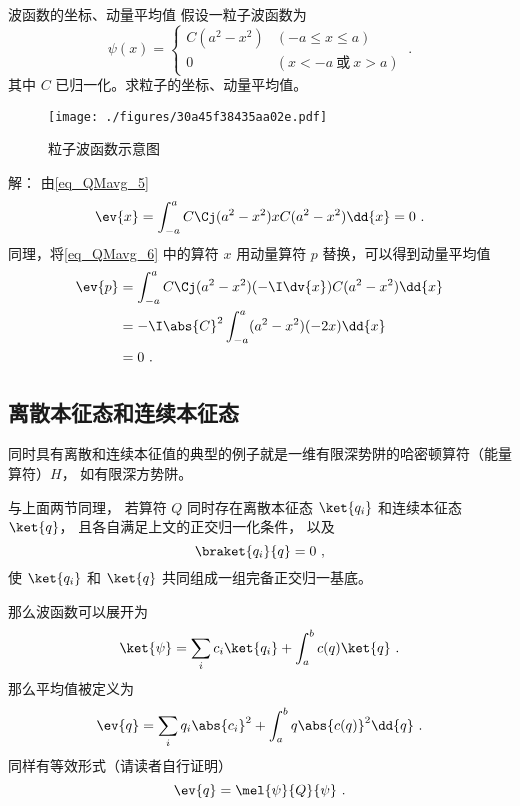 \begin{example}{波函数的坐标、动量平均值}
假设一粒子波函数为
\begin{equation}
\psi(x)=
\begin{cases}
C(a^2-x^2) &(-a\leqslant x\leqslant a)\\
0 &(x<-a \ \text{或}\ x>a) 
\end{cases}~.
\end{equation}
其中 $C$ 已归一化。求粒子的坐标、动量平均值。

\begin{figure}[ht]
\centering
\texttt{[image: ./figures/30a45f38435aa02e.pdf]}
\caption{粒子波函数示意图} \label{fig_QMavg_2}
\end{figure}

解： 由\autoref{eq_QMavg_5} 
\begin{equation}\label{eq_QMavg_6}
\ev{x}= \int_{-a}^a C\Cj(a^2-x^2)xC(a^2-x^2)\dd{x} = 0~.
\end{equation}
同理，将\autoref{eq_QMavg_6} 中的算符 $x$ 用动量算符 $p$ 替换，可以得到动量平均值
\begin{equation}
\begin{aligned}
\ev{p} &= \int_{-a}^a C\Cj(a^2-x^2)(-\I\dv{x})C(a^2-x^2)\dd{x}\\
&= -\I\abs{C}^2\int_{-a}^a (a^2-x^2)(-2x)\dd{x}\\
&= 0~.
\end{aligned}
\end{equation}
\end{example}

\subsection{离散本征态和连续本征态}
同时具有离散和连续本征值的典型的例子就是一维有限深势阱的哈密顿算符（能量算符）$H$， 如有限深方势阱。

与上面两节同理， 若算符 $Q$ 同时存在离散本征态 $\ket{q_i}$ 和连续本征态 $\ket{q}$， 且各自满足上文的正交归一化条件， 以及
\begin{equation}
\braket{q_i}{q} = 0~,
\end{equation}
使 $\ket{q_i}$ 和 $\ket{q}$ 共同组成一组完备正交归一基底。

那么波函数可以展开为
\begin{equation}
\ket{\psi} = \sum_i c_i \ket{q_i} + \int_a^b c(q) \ket{q}~.
\end{equation}
那么平均值被定义为
\begin{equation}
\ev{q} = \sum_i q_i \abs{c_i}^2 + \int_a^b q \abs{c(q)}^2 \dd{q}~.
\end{equation}
同样有等效形式（请读者自行证明）
\begin{equation}
\ev{q} = \mel{\psi}{Q}{\psi}~.
\end{equation}

